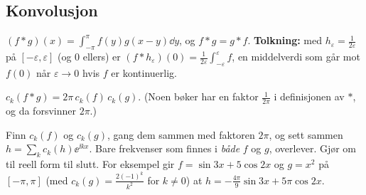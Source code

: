 \subsection{Konvolusjon}
\begin{defn}
$(f*g)(x)=\displaystyle\int_{-\pi}^{\pi}f(y)g(x-y)\dd y$, og $f*g=g*f$.
\textbf{Tolkning:} med $h_\varepsilon=\frac1{2\varepsilon}$ på $[-\varepsilon,\varepsilon]$ (og $0$ ellers) er $(f*h_\varepsilon)(0)=\frac1{2\varepsilon}\int_{-\varepsilon}^{\varepsilon}f$, en middelverdi som går mot $f(0)$ når $\varepsilon\to0$ hvis $f$ er kontinuerlig.
\end{defn}
\begin{teorem}
$c_k(f*g)=2\pi\,c_k(f)\,c_k(g)$. (Noen bøker har en faktor $\frac1{2\pi}$ i definisjonen av $*$, og da forsvinner $2\pi$.)
\end{teorem}
\begin{oppskrift}[regn ut $h=f*g$ (prøveeksamen 6c, øving 7)]
Finn $c_k(f)$ og $c_k(g)$, gang dem sammen med faktoren $2\pi$, og sett sammen $h=\sum_k c_k(h)\ee^{\ii kx}$. Bare frekvenser som finnes i \emph{både} $f$ og $g$, overlever. Gjør om til reell form til slutt.
For eksempel gir $f=\sin3x+5\cos2x$ og $g=x^2$ på $[-\pi,\pi]$ (med $c_k(g)=\frac{2(-1)^k}{k^2}$ for $k\neq0$) at $h=-\frac{4\pi}9\sin3x+5\pi\cos2x$.
\end{oppskrift}


